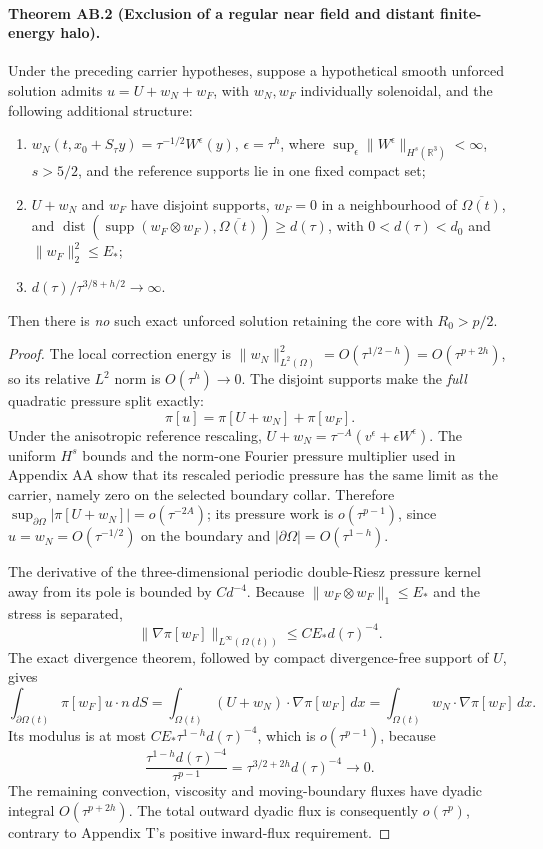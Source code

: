 \paragraph{Theorem AB.2 (Exclusion of a regular near field and distant finite-energy halo).}
Under the preceding carrier hypotheses, suppose a hypothetical smooth unforced solution admits $u=U+w_N+w_F$, with $w_N,w_F$ individually solenoidal, and the following additional structure:
\begin{enumerate}
\item $w_N(t,x_0+S_\tau y)=\tau^{-1/2}W^\epsilon(y)$, $\epsilon=\tau^h$, where $\sup_\epsilon\|W^\epsilon\|_{H^s(\mathbb R^3)}<\infty$, $s>5/2$, and the reference supports lie in one fixed compact set;
\item $U+w_N$ and $w_F$ have disjoint supports, $w_F=0$ in a neighbourhood of $\overline{\Omega(t)}$, and $\operatorname{dist}(\operatorname{supp}(w_F\otimes w_F),\overline{\Omega(t)})\ge d(\tau)$, with $0<d(\tau)<d_0$ and $\|w_F\|_2^2\le E_*$;
\item $d(\tau)/\tau^{3/8+h/2}\to\infty$.
\end{enumerate}
Then there is \emph{no} such exact unforced solution retaining the core with $R_0>p/2$.
\begin{proof}
The local correction energy is $\|w_N\|_{L^2(\Omega)}^2=O(\tau^{1/2-h})=O(\tau^{p+2h})$, so its relative $L^2$ norm is $O(\tau^h)\to0$. The disjoint supports make the \emph{full} quadratic pressure split exactly:
\[
\pi[u]=\pi[U+w_N]+\pi[w_F].
\]
Under the anisotropic reference rescaling,
$U+w_N=\tau^{-A}(v^\epsilon+\epsilon W^\epsilon)$.
The uniform $H^s$ bounds and the norm-one Fourier pressure multiplier used in Appendix AA show that its rescaled periodic pressure has the same limit as the carrier, namely zero on the selected boundary collar. Therefore
$\sup_{\partial\Omega}|\pi[U+w_N]|=o(\tau^{-2A})$;
its pressure work is $o(\tau^{p-1})$, since $u=w_N=O(\tau^{-1/2})$ on the boundary and $|\partial\Omega|=O(\tau^{1-h})$.

The derivative of the three-dimensional periodic double-Riesz pressure kernel away from its pole is bounded by $C d^{-4}$. Because
$\|w_F\otimes w_F\|_1\le E_*$ and the stress is separated,
\begin{equation}\label{eq:AB-far-gradient}
\|\nabla\pi[w_F]\|_{L^\infty(\Omega(t))}
\le C E_*d(\tau)^{-4}.
\end{equation}
The exact divergence theorem, followed by compact divergence-free support of $U$, gives
\[
\int_{\partial\Omega(t)}\pi[w_F]u\cdot n\,dS
=\int_{\Omega(t)}(U+w_N)\cdot\nabla\pi[w_F]\,dx
=\int_{\Omega(t)}w_N\cdot\nabla\pi[w_F]\,dx.
\]
Its modulus is at most $C E_*\tau^{1-h}d(\tau)^{-4}$, which is $o(\tau^{p-1})$, because
\[
\frac{\tau^{1-h}d(\tau)^{-4}}{\tau^{p-1}}
=\tau^{3/2+2h}d(\tau)^{-4}\longrightarrow0.
\]
The remaining convection, viscosity and moving-boundary fluxes have dyadic integral $O(\tau^{p+2h})$. The total outward dyadic flux is consequently $o(\tau^p)$, contrary to Appendix T's positive inward-flux requirement.
\end{proof}

